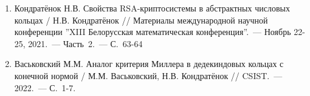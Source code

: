 \begin{enumerate}
    \item \label{source:XIII_Belarussian_math_conference_2021}
    Кондратёнок Н.В. Свойства RSA-криптосистемы в абстрактных числовых кольцах / Н.В. Кондратёнок // Материалы международной научной конференции ''XIII Белорусская математическая конференция''.~--- Ноябрь 22-25, 2021.~--- Часть~2.~--- С.~63-64

    \item \label{source:CSIST_2022}
    Васьковский М.М. Аналог критерия Миллера в дедекиндовых кольцах с конечной нормой / М.М. Васьковский, Н.В. Кондратёнок // CSIST.~--- 2022.~--- С.~1-7.

\end{enumerate}

